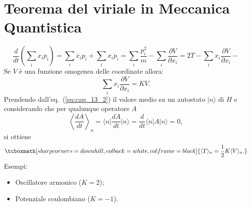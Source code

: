 \documentclass[a4paper,12pt,oneside]{book}
\begin{document}
\section{Teorema del viriale in Meccanica Quantistica}
	\begin{equation}
	\label{eq:cap_13_2}
		\frac{d}{dt}\left( \sum _i x_i p_i \right) = \sum _i\dot{x}_i p_i + \sum _i	x_i \dot{p}_i = \sum _i \frac{p_i ^2}{m}- \sum _i \frac{\partial V}{\partial x_i} = 2T - \sum _i x_i \frac{\partial V}{\partial x_i}-
	\end{equation}
Se $V$ è una funzione omogenea delle coordinate allora:
	\begin{equation}
		\sum _ i x_i \frac{\partial V}{\partial x_i} = KV.
	\end{equation}
Prendendo dall'eq.~(\ref{eq:cap_13_2}) il valore medio su un autostato $\vert n \rangle$ di $H$ e considerando che per qualunque operatore $A$
	\begin{equation}
		\left\langle \frac{dA}{dt} \right\rangle _n = \langle n \vert \frac{dA}{dt}\vert n \rangle = \frac{d}{dt}\langle n \vert A \vert n \rangle = 0, 
	\end{equation}
si ottiene
	\begin{equation}
		\tcboxmath[sharp corners=downhill, colback=white, colframe=black]{
		\langle T \rangle _n = \frac{1}{2} K \langle V \rangle _n.
		}
	\end{equation}
Esempi:\begin{itemize}
\item Oscillatore armonico ($K=2$);
\item Potenziale coulombiano ($K=-1$).
\end{itemize}
\end{document}

